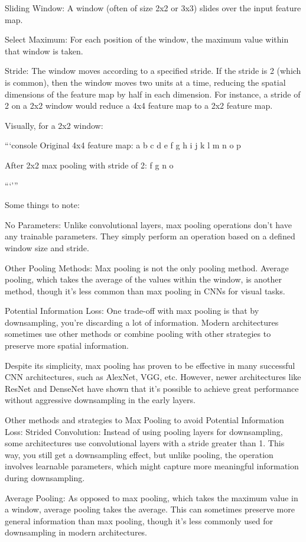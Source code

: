     Sliding Window: A window (often of size 2x2 or 3x3) slides over the input feature map.

    Select Maximum: For each position of the window, the maximum value within that window is taken.

    Stride: The window moves according to a specified stride. If the stride is 2 (which is common), then the window moves two units at a time, reducing the spatial dimensions of the feature map by half in each dimension. For instance, a stride of 2 on a 2x2 window would reduce a 4x4 feature map to a 2x2 feature map.

Visually, for a 2x2 window:

```console
Original 4x4 feature map:
a b c d
e f g h
i j k l
m n o p

After 2x2 max pooling with stride of 2:
f g
n o

```'''


Some things to note:

    No Parameters: Unlike convolutional layers, max pooling operations don’t have any trainable parameters. They simply perform an operation based on a defined window size and stride.

    Other Pooling Methods: Max pooling is not the only pooling method. Average pooling, which takes the average of the values within the window, is another method, though it’s less common than max pooling in CNNs for visual tasks.

    Potential Information Loss: One trade-off with max pooling is that by downsampling, you're discarding a lot of information. Modern architectures sometimes use other methods or combine pooling with other strategies to preserve more spatial information.

Despite its simplicity, max pooling has proven to be effective in many successful CNN architectures, such as AlexNet, VGG, etc. However, newer architectures like ResNet and DenseNet have shown that it's possible to achieve great performance without aggressive downsampling in the early layers.


Other methods and strategies to Max Pooling to avoid Potential Information Loss: 
    Strided Convolution: Instead of using pooling layers for downsampling, some architectures use convolutional layers with a stride greater than 1. This way, you still get a downsampling effect, but unlike pooling, the operation involves learnable parameters, which might capture more meaningful information during downsampling.

    Average Pooling: As opposed to max pooling, which takes the maximum value in a window, average pooling takes the average. This can sometimes preserve more general information than max pooling, though it's less commonly used for downsampling in modern architectures.

